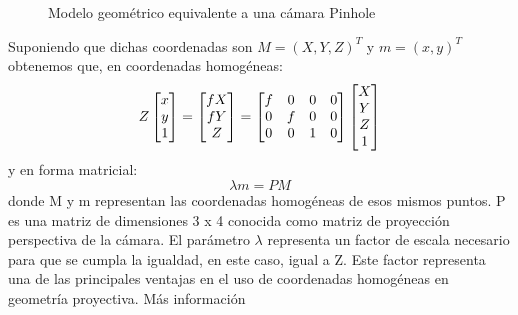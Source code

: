 \documentclass[a4,10pt]{article}
\begin{document}
\begin{enumerate}
\begin{figure}
\begin{center}
\end{center}
\caption{Modelo geométrico equivalente a una cámara Pinhole}
\label{fig:pinholegeo}
\end{figure}
Suponiendo que dichas coordenadas son $ M =(X,Y,Z)^T $ y $ m=(x,y)^T $ obtenemos que, en coordenadas homogéneas:
\begin{equation}
Z\\
\begin{bmatrix}
x\\
y\\
1
\end{bmatrix}
=
\begin{bmatrix}
fX\\
fY\\
Z
\end{bmatrix}
=
\begin{bmatrix}
f & 0 & 0 & 0\\
0 & f & 0 & 0\\
0 & 0 & 1 & 0
\end{bmatrix}
\begin{bmatrix}
X\\
Y\\
Z\\
1
\end{bmatrix}
\end{equation}
y en forma matricial:
\begin{equation}
\lambda m = PM
\end{equation}
donde M y m representan las coordenadas homogéneas de esos mismos puntos. P es una matriz de dimensiones 3 x 4 conocida como matriz de proyección perspectiva de la cámara. El parámetro $ \lambda $ representa un factor de escala necesario para que se cumpla la igualdad, en este caso, igual a Z. Este factor representa una de las principales ventajas en el uso de coordenadas homogéneas en geometría proyectiva. Más información \cite{pinhole}


\end{enumerate}
\end{document}
